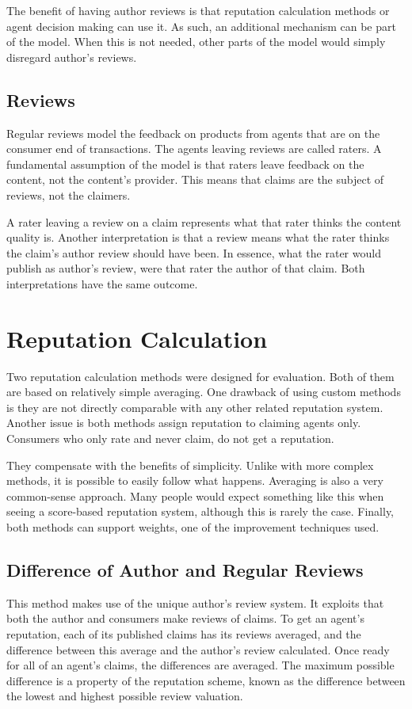 \documentclass[%
    ]{\PathToTumTemplate/thesis/tum_thesis}
\begin{document}
The benefit of having author reviews is that reputation calculation methods or agent decision making can use it.
As such, an additional mechanism can be part of the model.
When this is not needed, other parts of the model would simply disregard author's reviews.


\subsection{Reviews}\label{sec:approach_reviews}
Regular reviews model the feedback on products from agents that are on the consumer end of transactions.
The agents leaving reviews are called raters.
A fundamental assumption of the model is that raters leave feedback on the content, not the content's provider.
This means that claims are the subject of reviews, not the claimers.

A rater leaving a review on a claim represents what that rater thinks the content quality is.
Another interpretation is that a review means what the rater thinks the claim's author review should have been.
In essence, what the rater would publish as author's review, were that rater the author of that claim.
Both interpretations have the same outcome.




\section{Reputation Calculation}\label{sec:approach_reputation_calculation}
Two reputation calculation methods were designed for evaluation.
Both of them are based on relatively simple averaging.
One drawback of using custom methods is they are not directly comparable with any other related reputation system.
Another issue is both methods assign reputation to claiming agents only.
Consumers who only rate and never claim, do not get a reputation.

They compensate with the benefits of simplicity.
Unlike with more complex methods, it is possible to easily follow what happens.
Averaging is also a very common-sense approach.
Many people would expect something like this when seeing a score-based reputation system, although this is rarely the case.
Finally, both methods can support weights, one of the improvement techniques used.

\subsection{Difference of Author and Regular Reviews}
This method makes use of the unique author's review system.
It exploits that both the author and consumers make reviews of claims.
To get an agent's reputation, each of its published claims has its reviews averaged, and the difference between this average and the author's review calculated.
Once ready for all of an agent's claims, the differences are averaged.
The maximum possible difference is a property of the reputation scheme, known as the difference between the lowest and highest possible review valuation.
\end{document}
